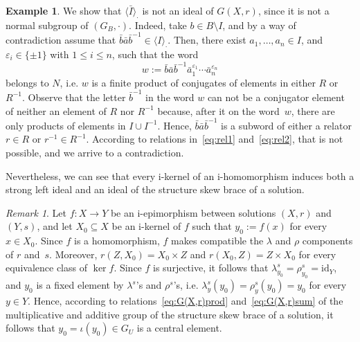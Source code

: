 \documentclass[12pt, a4paper, english]{article}
\theoremstyle{definition}
\newtheorem{exemple}[teorema]{Example}
\theoremstyle{remark}
\newtheorem*{nota}{Remark}
\newcommand{\bigcdot}{\boldsymbol{\cdot}}
\begin{document}
\begin{exemple}
We show that $\langle \bar I \rangle_{\bigcdot}$ is not an ideal of $G(X,r)$, since it is not a normal subgroup of $(G_B,\cdot)$. Indeed, take $b \in B\setminus I$, and by a way of contradiction assume that $\bar b\bar a\bar b^{-1}\in \langle I \rangle_{\bigcdot}$. Then, there exist $a_1, \ldots, a_n \in I$, and $\varepsilon_i\in \{\pm 1\}$ with $1\leq i \leq n$, such that the word
\[ w:= \bar b \bar a\bar b^{-1}\bar a_1^{\varepsilon_1}\cdots \bar a_n^{\varepsilon_n} \]
belongs to $N$, i.e. $w$ is a finite product of conjugates of elements in either $R$ or~$R^{-1}$. Observe that the letter $\bar b^{-1}$ in the word $w$ can not be a conjugator element of neither an element of $R$ nor $R^{-1}$ because, after it on the word~$w$, there are only products of elements in $I\cup I^{-1}$. Hence, $\bar b\bar a\bar b^{-1}$ is a subword of either a relator $r\in R$ or $r^{-1}\in R^{-1}$. According to relations in~\eqref{eq:rel1} and~\eqref{eq:rel2}, that is not possible, and we arrive to a contradiction.
\end{exemple}


Nevertheless, we can see that every i-kernel of an i-homomorphism induces both a strong left ideal and an ideal of the structure skew brace of a solution.

\begin{nota}
\label{nota:imatge-i-kernel}
Let $f\colon X \rightarrow Y$ be an i-epimorphism between solutions $(X,r)$ and $(Y,s)$, and let $X_0\subseteq X$ be an i-kernel of $f$ such that $y_0:= f(x)$ for every $x\in X_0$. Since $f$ is a homomorphism, $f$ makes compatible the $\lambda$ and $\rho$ components of $r$ and~$s$. Moreover, $r(Z,X_0) = X_0\times Z$ and $r(X_0,Z) = Z \times X_0$ for every equivalence class of $\ker f$. Since $f$ is surjective, it follows that $\lambda_{y_0}^s = \rho_{y_0}^s = \mathrm{id}_Y$, and $y_0$ is a fixed element by $\lambda^s$'s and $\rho^s$'s, i.e. $\lambda^s_y(y_0) = \rho^s_y(y_0) = y_0$ for every $y\in Y$. Hence, according to relations~\eqref{eq:G(X,r)prod} and~\eqref{eq:G(X,r)sum} of the multiplicative and additive group of the structure skew brace of a solution, it follows that $y_0 = \iota(y_0)\in G_U$ is a central element.
\end{nota}
\end{document}
